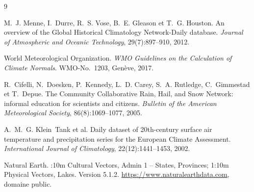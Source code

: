 \documentclass[11pt]{article}
\begin{document}
\newpage
\thispagestyle{empty}

\newpage
\thispagestyle{empty}
\begin{thebibliography}{9}

M.~J. Menne, I.~Durre, R.~S. Vose, B.~E. Gleason et T.~G. Houston.
\newblock An overview of the Global Historical Climatology Network-Daily database.
\newblock \emph{Journal of Atmospheric and Oceanic Technology}, 29(7):897--910, 2012.

World Meteorological Organization.
\newblock \emph{WMO Guidelines on the Calculation of Climate Normals}.
\newblock WMO-No.~1203, Genève, 2017.

R.~Cifelli, N.~Doesken, P.~Kennedy, L.~D. Carey, S.~A. Rutledge, C.~Gimmestad et T.~Depue.
\newblock The Community Collaborative Rain, Hail, and Snow Network: informal education for scientists and citizens.
\newblock \emph{Bulletin of the American Meteorological Society}, 86(8):1069--1077, 2005.

A.~M.~G. Klein~Tank et al.
\newblock Daily dataset of 20th-century surface air temperature and precipitation series for the European Climate Assessment.
\newblock \emph{International Journal of Climatology}, 22(12):1441--1453, 2002.

Natural Earth.
:10m Cultural Vectors, Admin 1 -- States, Provinces; 1:10m Physical Vectors, Lakes. Version 5.1.2.
\newblock \url{https://www.naturalearthdata.com}, domaine public.

\end{thebibliography}

\appendix




\end{document}
